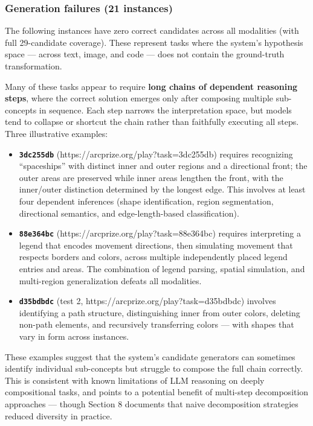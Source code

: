\documentclass[11pt]{article}
\providecommand{\tightlist}{%
  \setlength{\itemsep}{0pt}\setlength{\parskip}{0pt}}
\begin{document}
\hypertarget{generation-failures-21-instances}{%
\subsubsection{Generation failures (21
instances)}\label{generation-failures-21-instances}}

The following instances have zero correct candidates across all
modalities (with full 29-candidate coverage). These represent tasks
where the system's hypothesis space --- across text, image, and code ---
does not contain the ground-truth transformation.

Many of these tasks appear to require \textbf{long chains of dependent
reasoning steps}, where the correct solution emerges only after
composing multiple sub-concepts in sequence. Each step narrows the
interpretation space, but models tend to collapse or shortcut the chain
rather than faithfully executing all steps. Three illustrative examples:

\begin{itemize}
\tightlist
\item
  \textbf{\texttt{3dc255db}} (https://arcprize.org/play?task=3dc255db)
  requires recognizing ``spaceships'' with distinct inner and outer
  regions and a directional front; the outer areas are preserved while
  inner areas lengthen the front, with the inner/outer distinction
  determined by the longest edge. This involves at least four dependent
  inferences (shape identification, region segmentation, directional
  semantics, and edge-length-based classification).
\item
  \textbf{\texttt{88e364bc}} (https://arcprize.org/play?task=88e364bc)
  requires interpreting a legend that encodes movement directions, then
  simulating movement that respects borders and colors, across multiple
  independently placed legend entries and areas. The combination of
  legend parsing, spatial simulation, and multi-region generalization
  defeats all modalities.
\item
  \textbf{\texttt{d35bdbdc}} (test 2,
  https://arcprize.org/play?task=d35bdbdc) involves identifying a path
  structure, distinguishing inner from outer colors, deleting non-path
  elements, and recursively transferring colors --- with shapes that
  vary in form across instances.
\end{itemize}

These examples suggest that the system's candidate generators can
sometimes identify individual sub-concepts but struggle to compose the
full chain correctly. This is consistent with known limitations of LLM
reasoning on deeply compositional tasks, and points to a potential
benefit of multi-step decomposition approaches --- though Section 8
documents that naive decomposition strategies reduced diversity in
practice.
\end{document}

